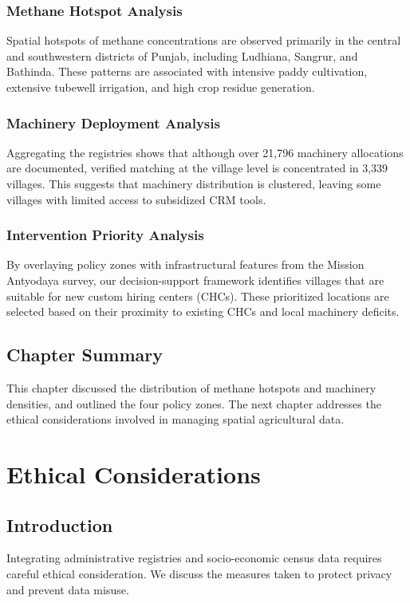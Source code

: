 \documentclass[12pt,a4paper]{report}
\begin{document}
\subsection{Methane Hotspot Analysis}
Spatial hotspots of methane concentrations are observed primarily in the central and southwestern districts of Punjab, including Ludhiana, Sangrur, and Bathinda. These patterns are associated with intensive paddy cultivation, extensive tubewell irrigation, and high crop residue generation.

\subsection{Machinery Deployment Analysis}
Aggregating the registries shows that although over 21,796 machinery allocations are documented, verified matching at the village level is concentrated in 3,339 villages. This suggests that machinery distribution is clustered, leaving some villages with limited access to subsidized CRM tools.

\subsection{Intervention Priority Analysis}
By overlaying policy zones with infrastructural features from the Mission Antyodaya survey, our decision-support framework identifies villages that are suitable for new custom hiring centers (CHCs). These prioritized locations are selected based on their proximity to existing CHCs and local machinery deficits.

\section{Chapter Summary}
This chapter discussed the distribution of methane hotspots and machinery densities, and outlined the four policy zones. The next chapter addresses the ethical considerations involved in managing spatial agricultural data.

\chapter{Ethical Considerations}
\label{ch:ethics}

\section{Introduction}
Integrating administrative registries and socio-economic census data requires careful ethical consideration. We discuss the measures taken to protect privacy and prevent data misuse.
\end{document}

